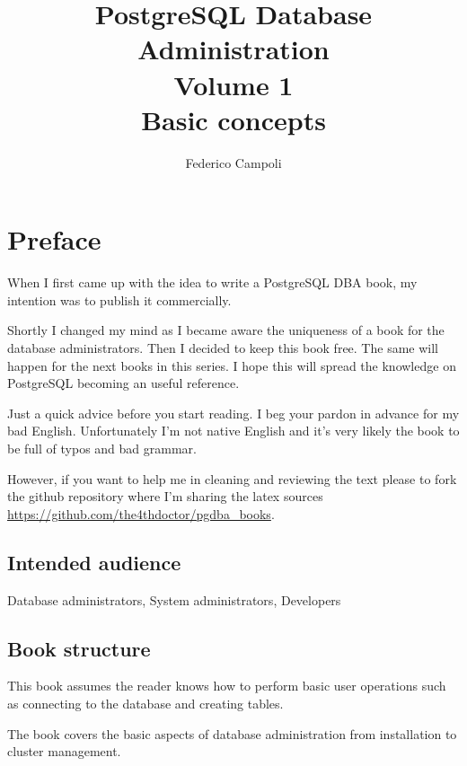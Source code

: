 \documentclass[oneside]{book}
\author{Federico Campoli}
\title{PostgreSQL Database Administration \\ Volume 1 \\ Basic concepts}
\begin{document}

\maketitle

\newpage{}



\tableofcontents{}

\chapter*{Preface}
When I first came up with the idea to write a PostgreSQL DBA book, my intention was to 
publish it commercially.\newline

Shortly I changed my mind as I became aware the uniqueness of a book for the database 
administrators. Then I decided to keep this book free. The same will happen for the 
next books in this series. I hope this will spread the knowledge on PostgreSQL becoming an 
useful reference.\newline

Just a quick advice before you start reading. I beg your pardon in advance for my 
bad English. Unfortunately I'm not native English and it's very likely the book to be full of 
typos and bad grammar.\newline

However, if you want to help me in cleaning and reviewing the text please to fork 
the github repository where I'm sharing the latex sources 
\href{https://github.com/the4thdoctor/pgdba\_books}{
https://github.com/the4thdoctor/pgdba\_books}.\newline


\section*{Intended audience}
Database administrators, System administrators, Developers

\section*{Book structure}
This book assumes the reader knows how to perform basic user operations such as
connecting to the database and creating tables.\newline

The book covers the basic aspects of database administration from installation
to cluster management.\newline
\end{document}
